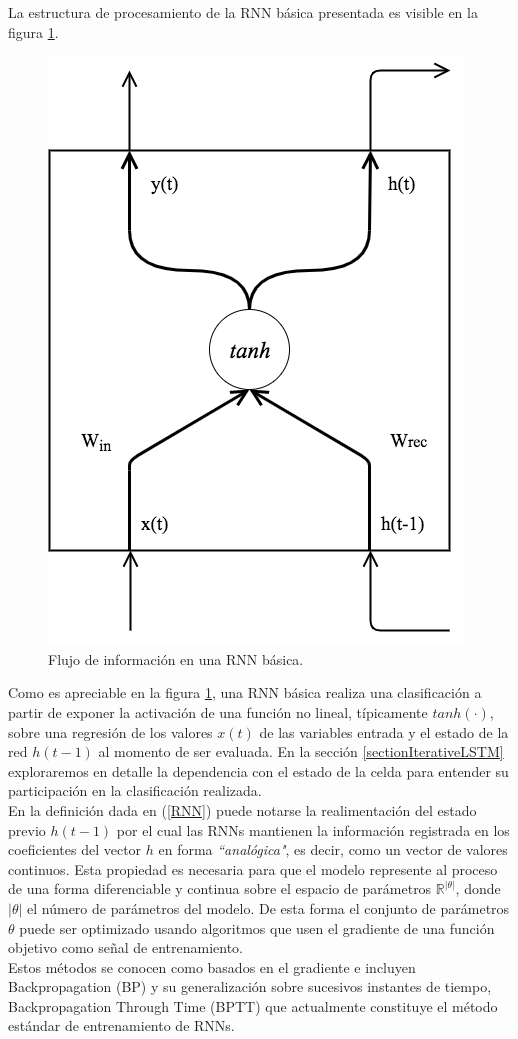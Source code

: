 \documentclass{article}
\begin{document}
	La estructura de procesamiento de la RNN básica presentada es visible en la figura \ref{basicRNN}.
	\begin{figure}[H]
		\centering
		\includegraphics[scale=0.2]{basicRNN}
		\caption{Flujo de información en una RNN básica.}
		\label{basicRNN}
	\end{figure}
	
	Como es apreciable en la figura \ref{basicRNN}, una RNN básica realiza una clasificación a partir de exponer la activación de una función no lineal, típicamente $tanh(\cdot)$, sobre una regresión de los valores $x(t)$ de las variables entrada y el estado de la red $h(t-1)$ al momento de ser evaluada. En la sección \ref{sectionIterativeLSTM} exploraremos en detalle la dependencia con el estado de la celda para entender su participación en la clasificación realizada.\\
	
	En la definición dada en (\ref{RNN}) puede notarse la realimentación del estado previo $h(t-1)$ por el cual las RNNs mantienen la información registrada en los coeficientes del vector $h$ en forma \textit{``analógica"}, es decir, como un vector de valores continuos. Esta propiedad es necesaria para que el modelo represente al proceso de una forma diferenciable y continua sobre el espacio de parámetros $\mathbb{R}^{|\theta|}$, donde $|\theta|$ el número de parámetros del modelo. 
	De esta forma el conjunto de parámetros $\theta$ puede ser optimizado usando algoritmos que usen el gradiente de una función objetivo como señal de entrenamiento. \\
	Estos métodos se conocen como basados en el gradiente\cite{20SutskeverPhdThesis} e incluyen Backpropagation (BP) y su generalización sobre sucesivos instantes de tiempo, Backpropagation Through Time (BPTT) que actualmente constituye el método estándar de entrenamiento de RNNs.\\
	
\end{document}
